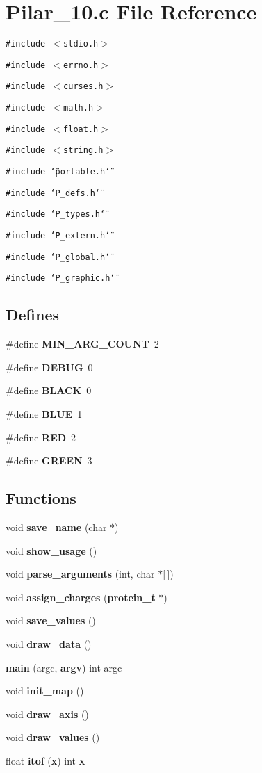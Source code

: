 \section{Pilar\_\-10.c File Reference}
\label{Pilar__10_8c}
{\tt \#include $<$stdio.h$>$}\par
{\tt \#include $<$errno.h$>$}\par
{\tt \#include $<$curses.h$>$}\par
{\tt \#include $<$math.h$>$}\par
{\tt \#include $<$float.h$>$}\par
{\tt \#include $<$string.h$>$}\par
{\tt \#include \char`\"{}portable.h\char`\"{}}\par
{\tt \#include \char`\"{}P\_\-defs.h\char`\"{}}\par
{\tt \#include \char`\"{}P\_\-types.h\char`\"{}}\par
{\tt \#include \char`\"{}P\_\-extern.h\char`\"{}}\par
{\tt \#include \char`\"{}P\_\-global.h\char`\"{}}\par
{\tt \#include \char`\"{}P\_\-graphic.h\char`\"{}}\par
\subsection*{Defines}
\begin{CompactItemize}
\item 
\#define {\bf MIN\_\-ARG\_\-COUNT}\ 2
\item 
\#define {\bf DEBUG}\ 0
\item 
\#define {\bf BLACK}\ 0
\item 
\#define {\bf BLUE}\ 1
\item 
\#define {\bf RED}\ 2
\item 
\#define {\bf GREEN}\ 3
\end{CompactItemize}
\subsection*{Functions}
\begin{CompactItemize}
\item 
void {\bf save\_\-name} (char $\ast$)
\item 
void {\bf show\_\-usage} ()
\item 
void {\bf parse\_\-arguments} (int, char $\ast$[$\,$])
\item 
void {\bf assign\_\-charges} ({\bf protein\_\-t} $\ast$)
\item 
void {\bf save\_\-values} ()
\item 
void {\bf draw\_\-data} ()
\item 
{\bf main} (argc, {\bf argv}) int argc
\item 
void {\bf init\_\-map} ()
\item 
void {\bf draw\_\-axis} ()
\item 
void {\bf draw\_\-values} ()
\item 
float {\bf itof} ({\bf x}) int {\bf x}
\end{CompactItemize}
